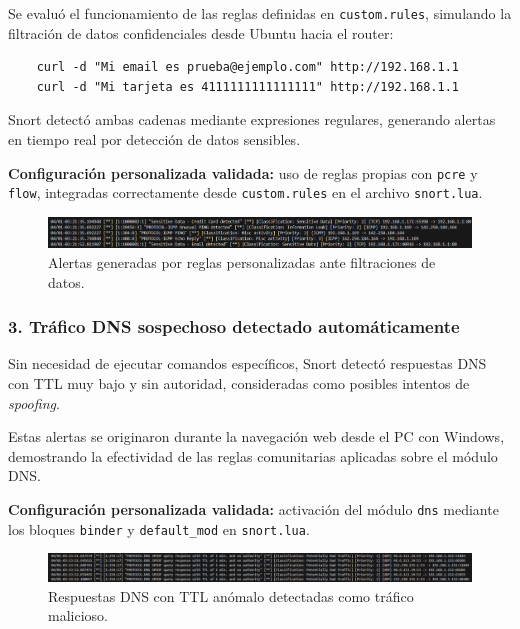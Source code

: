 \documentclass[11pt,a4paper,twoside]{report}
\begin{document}
Se evaluó el funcionamiento de las reglas definidas en \texttt{custom.rules}, simulando la filtración de datos confidenciales desde Ubuntu hacia el router:

\begin{verbatim}
	curl -d "Mi email es prueba@ejemplo.com" http://192.168.1.1
	curl -d "Mi tarjeta es 4111111111111111" http://192.168.1.1
\end{verbatim}

Snort detectó ambas cadenas mediante expresiones regulares, generando alertas en tiempo real por detección de datos sensibles.\newline

\textbf{Configuración personalizada validada:} uso de reglas propias con \texttt{pcre} y \texttt{flow}, integradas correctamente desde \texttt{custom.rules} en el archivo \texttt{snort.lua}.

\begin{figure}[H]
	\centering
	\includegraphics[width=\textwidth]{pruebas/4.png}
	\caption{Alertas generadas por reglas personalizadas ante filtraciones de datos.}
\end{figure}

\vspace{0.5cm}

\subsubsection*{3. Tráfico DNS sospechoso detectado automáticamente}

Sin necesidad de ejecutar comandos específicos, Snort detectó respuestas DNS con TTL muy bajo y sin autoridad, consideradas como posibles intentos de \textit{spoofing}.\newline

Estas alertas se originaron durante la navegación web desde el PC con Windows, demostrando la efectividad de las reglas comunitarias aplicadas sobre el módulo DNS.

\textbf{Configuración personalizada validada:} activación del módulo \texttt{dns} mediante los bloques \texttt{binder} y \texttt{default\_mod} en \texttt{snort.lua}.

\begin{figure}[H]
	\centering
	\includegraphics[width=\textwidth]{pruebas/2.png}
	\caption{Respuestas DNS con TTL anómalo detectadas como tráfico malicioso.}
\end{figure}
\end{document}
